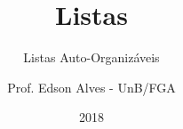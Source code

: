 \title{Listas}
\subtitle{Listas Auto-Organizáveis}
\author{Prof. Edson Alves - UnB/FGA}
\date{2018}
